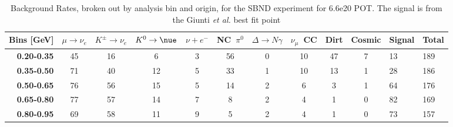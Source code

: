 \begin{table}
\centering

\caption{Background Rates, broken out by analysis bin and origin, for the SBND experiment for 6.6e20 POT. The signal is from the Giunti {\em et al.} best fit point}
\label{tab:sbn_event_rates_no_signal}
\begin{tabular}{r|cccccccccll}
\multicolumn{1}{l|}{Bins [GeV]} & \multicolumn{1}{l}{$\mu\rightarrow\nu_e$} & \multicolumn{1}{l}{$K^{\pm}\rightarrow \nu_e$} & \multicolumn{1}{l}{$K^0 \rightarrow \nue$} & \multicolumn{1}{l}{$\nu + e^-$} & \multicolumn{1}{l}{NC~$\pi^0$} & \multicolumn{1}{l}{$\Delta \rightarrow N\gamma$} & \multicolumn{1}{l}{$\nu_{\mu}$~CC} & \multicolumn{1}{l}{Dirt} & \multicolumn{1}{l}{Cosmic} & Signal               & Total \\ \hline
\textbf{0.20-0.35}    & 45                          & 16                          & 6                           & 3                        & 56                         & 0                          & 10                         & 47                       & 7                          & 13                   & 189   \\
\textbf{0.35-0.50}    & 71                          & 40                          & 12                          & 5                        & 33                         & 1                          & 10                         & 13                       & 1                          & 28                   & 186   \\
\textbf{0.50-0.65}    & 76                          & 56                          & 15                          & 5                        & 14                         & 2                          & 6                          & 3                        & 1                          & 64                   & 176   \\
\textbf{0.65-0.80}    & 77                          & 57                          & 14                          & 7                        & 8                          & 2                          & 4                          & 1                        & 0                          & 82                   & 169   \\
\textbf{0.80-0.95}    & 69                          & 58                          & 11                          & 9                        & 5                          & 2                          & 4                          & 1                        & 0                          & 73                   & 157   \\

\end{tabular}
\end{table}
